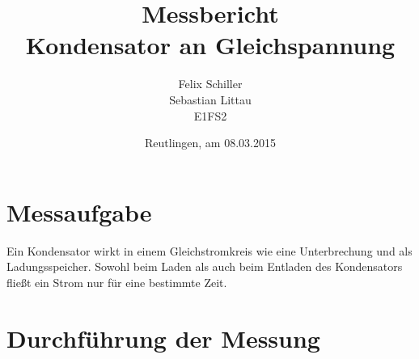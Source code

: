 \documentclass[
a4paper,     %
 headsepline, %
11pt         %
]{scrartcl}  %
\title{Messbericht \\ Kondensator an Gleichspannung}
\author{Felix Schiller \\ Sebastian Littau \\ E1FS2}
\date{Reutlingen, am 08.03.2015}
\begin{document}

\maketitle

\newpage
\tableofcontents





\section{Messaufgabe}
Ein Kondensator wirkt in einem Gleichstromkreis wie eine Unterbrechung und als Ladungsspeicher. Sowohl beim Laden als auch beim Entladen des Kondensators fließt ein Strom nur für eine bestimmte Zeit.

\section{Durchführung der Messung}
\end{document}
